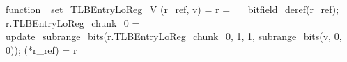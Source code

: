 function _set_TLBEntryLoReg_V (r_ref, v) = {
    r = __bitfield_deref(r_ref);
    r.TLBEntryLoReg_chunk_0 = update_subrange_bits(r.TLBEntryLoReg_chunk_0, 1, 1, subrange_bits(v, 0, 0));
    (*r_ref) = r
}
